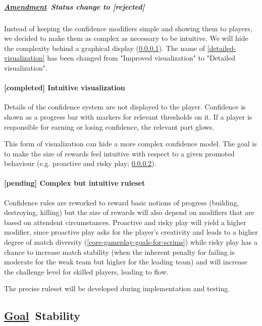 \documentclass{scrartcl}
\newcommand{\goal}     [0]{\textbf{\underline{Goal}\ }}
\newcommand{\pending}  [0]{\textcolor{pending}  {\textbf{[pending] }}}
\newcommand{\rejected} [0]{\textcolor{rejected} {\textbf{[rejected] }}}
\newcommand{\completed}[0]{\textcolor{completed}{\textbf{[completed] }}}
\newcommand{\amendment}[0]{\textbf{\underline{Amendment}\ }}
\begin{document}
\subparagraph{\amendment Status change to \rejected}

Instead of keeping the confidence modifiers simple and showing them to players, we decided to make them as complex as necessary to be intuitive. We will hide the complexity behind a graphical display (\ref{intuitive-visualization}). The name of \ref{detailed-visualization} has been changed from "Improved visualization" to "Detailed visualization".

\paragraph{\completed Intuitive visualization}
\label{intuitive-visualization}

Details of the confidence system are not displayed to the player. Confidence is shown as a progress bar with markers for relevant thresholds on it. If a player is responsible for earning or losing confidence, the relevant part glows.

This form of visualization can hide a more complex confidence model. The goal is to make the size of rewards feel intuitive with respect to a given promoted behaviour (e.g. proactive and risky play; \ref{complex-but-intuitive-ruleset}).

\paragraph{\pending Complex but intuitive ruleset}
\label{complex-but-intuitive-ruleset}

Confidence rules are reworked to reward basic notions of progress (building, destroying, killing) but the size of rewards will also depend on modifiers that are based on attendent circumstances. Proactive and risky play will yield a higher modifier, since proactive play asks for the player's creativity and leads to a higher degree of match diversity (\ref{core-gameplay-goals-for-scrims}) while risky play has a chance to increase match stability (when the inherent penalty for failing is moderate for the weak team but higher for the leading team) and will increase the challenge level for skilled players, leading to flow.

The precise ruleset will be developed during implementation and testing.

\subsection{\goal Stability}
\label{stability}
\end{document}
